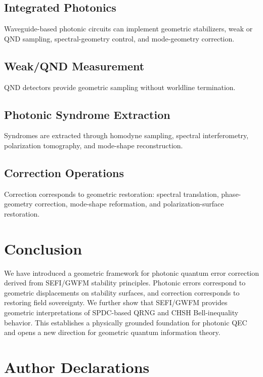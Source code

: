\documentclass[aip, adv, reprint, superscriptaddress]{revtex4-2}
\begin{document}
\subsection{Integrated Photonics}

Waveguide-based photonic circuits can implement geometric stabilizers, weak or QND 
sampling, spectral-geometry control, and mode-geometry correction.

\subsection{Weak/QND Measurement}

QND detectors provide geometric sampling without worldline termination.

\subsection{Photonic Syndrome Extraction}

Syndromes are extracted through homodyne sampling, spectral interferometry, 
polarization tomography, and mode-shape reconstruction.

\subsection{Correction Operations}

Correction corresponds to geometric restoration: spectral translation, phase-geometry 
correction, mode-shape reformation, and polarization-surface restoration.

\section{Conclusion}


We have introduced a geometric framework for photonic quantum error correction derived 
from SEFI/GWFM stability principles. Photonic errors correspond to geometric 
displacements on stability surfaces, and correction corresponds to restoring field 
sovereignty. We further show that SEFI/GWFM provides geometric interpretations of 
SPDC-based QRNG and CHSH Bell-inequality behavior. This establishes a physically 
grounded foundation for photonic QEC and opens a new direction for geometric quantum 
information theory.

\section*{Author Declarations}
\end{document}
